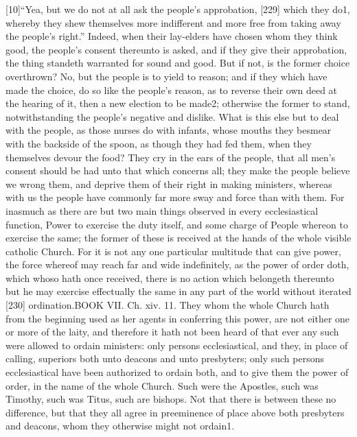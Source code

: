 [10]“Yea, but we do not at all ask the people’s approbation, [229] which they do1, whereby they shew themselves more indifferent and more free from taking away the people’s right.” Indeed, when their lay-elders have chosen whom they think good, the people’s consent thereunto is asked, and if they give their approbation, the thing standeth warranted for sound and good. But if not, is the former choice overthrown? No, but the people is to yield to reason; and if they which have made the choice, do so like the people’s reason, as to reverse their own deed at the hearing of it, then a new election to be made2; otherwise the former to stand, notwithstanding the people’s negative and dislike. What is this else but to deal with the people, as those nurses do with infants, whose mouths they besmear with the backside of the spoon, as though they had fed them, when they themselves devour the food? They cry in the ears of the people, that all men’s consent should be had unto that which concerns all; they make the people believe we wrong them, and deprive them of their right in making ministers, whereas with us the people have commonly far more sway and force than with them. For inasmuch as there are but two main things observed in every ecclesiastical function, Power to exercise the duty itself, and some charge of People whereon to exercise the same; the former of these is received at the hands of the whole visible catholic Church. For it is not any one particular multitude that can give power, the force whereof may reach far and wide indefinitely, as the power of order doth, which whoso hath once received, there is no action which belongeth thereunto but he may exercise effectually the same in any part of the world without iterated [230] ordination.BOOK VII. Ch. xiv. 11. They whom the whole Church hath from the beginning used as her agents in conferring this power, are not either one or more of the laity, and therefore it hath not been heard of that ever any such were allowed to ordain ministers: only persons ecclesiastical, and they, in place of calling, superiors both unto deacons and unto presbyters; only such persons ecclesiastical have been authorized to ordain both, and to give them the power of order, in the name of the whole Church. Such were the Apostles, such was Timothy, such was Titus, such are bishops. Not that there is between these no difference, but that they all agree in preeminence of place above both presbyters and deacons, whom they otherwise might not ordain1.

